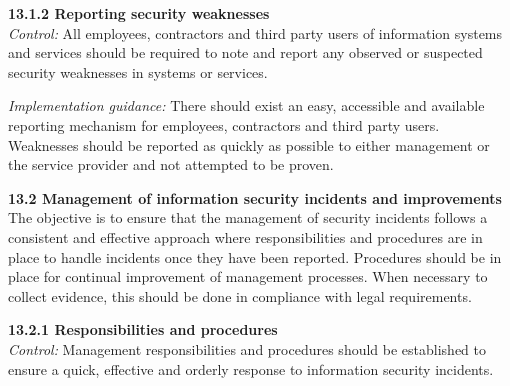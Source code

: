 \textbf{13.1.2 Reporting security weaknesses} \\
\emph{Control:} All employees, contractors and third party users of information systems and services should be required to note and report any observed or suspected security weaknesses in systems or services.

\emph{Implementation guidance:} There should exist an easy, accessible and available reporting mechanism for employees, contractors and third party users. Weaknesses should be reported as quickly as possible to either management or the service provider and not attempted to be proven.

\textbf{13.2 Management of information security incidents and improvements}\\
The objective is to ensure that the management of security incidents follows a consistent and effective approach where responsibilities and procedures are in place to handle incidents once they have been reported. Procedures should be in place for continual improvement of management processes. When necessary to collect evidence, this should be done in compliance with legal requirements.

\textbf{13.2.1 Responsibilities and procedures}\\ 
\emph{Control:} Management responsibilities and procedures should be established to ensure a quick, effective and orderly response to information security incidents.

